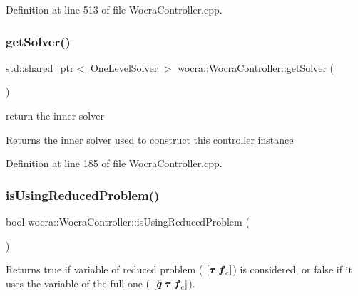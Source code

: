 Definition at line 513 of file Wocra\+Controller.\+cpp.

\hypertarget{classwocra_1_1WocraController_a94f67ee0ae6985969f4f1798bde0a9db}{}\label{classwocra_1_1WocraController_a94f67ee0ae6985969f4f1798bde0a9db} 
\subsubsection{\texorpdfstring{get\+Solver()}{getSolver()}}
{\footnotesize\ttfamily std\+::shared\+\_\+ptr$<$ \hyperlink{classocra_1_1OneLevelSolver}{One\+Level\+Solver} $>$ wocra\+::\+Wocra\+Controller\+::get\+Solver (\begin{DoxyParamCaption}{ }\end{DoxyParamCaption})}

return the inner solver

\begin{DoxyReturn}{Returns}
the inner solver used to construct this controller instance 
\end{DoxyReturn}


Definition at line 185 of file Wocra\+Controller.\+cpp.

\hypertarget{classwocra_1_1WocraController_a89eab1194e0598d8b30730429f286450}{}\label{classwocra_1_1WocraController_a89eab1194e0598d8b30730429f286450} 
\subsubsection{\texorpdfstring{is\+Using\+Reduced\+Problem()}{isUsingReducedProblem()}}
{\footnotesize\ttfamily bool wocra\+::\+Wocra\+Controller\+::is\+Using\+Reduced\+Problem (\begin{DoxyParamCaption}{ }\end{DoxyParamCaption})}

\begin{DoxyReturn}{Returns}
{\ttfamily true} if variable of reduced problem ( $ [ \mbox{\boldmath${\tau}$} \; \mbox{\boldmath${f}$}_c ] $) is considered, or {\ttfamily false} if it uses the variable of the full one ( $ [ \ddot{\mbox{\boldmath${q}$}} \; \mbox{\boldmath${\tau}$} \; \mbox{\boldmath${f}$}_c ] $). 
\end{DoxyReturn}



